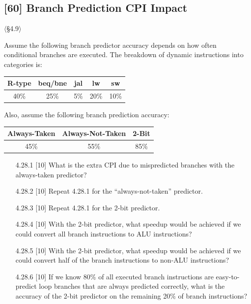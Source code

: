 \problembreak

\subsection{[60] Branch Prediction CPI Impact}
\hypertarget{prob-4.28}{}
\noindent$\langle$\S4.9$\rangle$\medskip

\noindent Assume the following branch predictor accuracy depends on how often
conditional branches are executed. The breakdown of dynamic instructions into
categories is:

\begin{center}
\begin{tabular}{ccccc}
\toprule
\textbf{R-type} & \textbf{beq/bne} & \textbf{jal} & \textbf{lw} &
\textbf{sw} \\
\midrule
40\% & 25\% & 5\% & 20\% & 10\% \\
\bottomrule
\end{tabular}
\end{center}

\noindent Also, assume the following branch prediction accuracy:

\begin{center}
\begin{tabular}{ccc}
\toprule
\textbf{Always-Taken} & \textbf{Always-Not-Taken} & \textbf{2-Bit} \\
\midrule
45\% & 55\% & 85\% \\
\bottomrule
\end{tabular}
\end{center}

\begin{enumerate}
  \item[4.28.1] [10] What is the extra CPI due to mispredicted branches with
        the always-taken predictor?
  \item[4.28.2] [10] Repeat 4.28.1 for the ``always-not-taken'' predictor.
  \item[4.28.3] [10] Repeat 4.28.1 for the 2-bit predictor.
  \item[4.28.4] [10] With the 2-bit predictor, what speedup would be
        achieved if we could convert all branch instructions to ALU
        instructions?
  \item[4.28.5] [10] With the 2-bit predictor, what speedup would be achieved
        if we could convert half of the branch instructions to non-ALU
        instructions?
  \item[4.28.6] [10] If we know 80\% of all executed branch instructions are
        easy-to-predict loop branches that are always predicted correctly,
        what is the accuracy of the 2-bit predictor on the remaining 20\% of
        branch instructions?
\end{enumerate}

